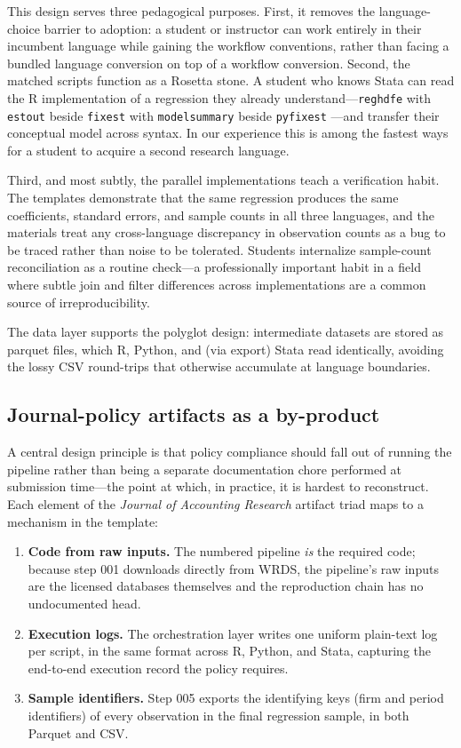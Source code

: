 \documentclass[12pt]{article}
\begin{document}
This design serves three pedagogical purposes. First, it removes the
language-choice barrier to adoption: a student or instructor can work
entirely in their incumbent language while gaining the workflow
conventions, rather than facing a bundled language conversion on top of a
workflow conversion. Second, the matched scripts function as a Rosetta
stone. A student who knows Stata can read the R implementation of a
regression they already understand---\texttt{reghdfe} with
\texttt{estout} \citep{reghdfe, estout} beside \texttt{fixest} with
\texttt{modelsummary} \citep{fixest, modelsummary} beside
\texttt{pyfixest} \citep{pyfixest}---and transfer their conceptual model
across syntax. In our experience this is among the fastest ways for a
student to acquire a second research language.

Third, and most subtly, the parallel implementations teach a verification
habit. The templates demonstrate that the same regression produces the
same coefficients, standard errors, and sample counts in all three
languages, and the materials treat any cross-language discrepancy in
observation counts as a bug to be traced rather than noise to be
tolerated. Students internalize sample-count reconciliation as a routine
check---a professionally important habit in a field where subtle join and
filter differences across implementations are a common source of
irreproducibility.

The data layer supports the polyglot design: intermediate datasets are
stored as parquet files, which R, Python, and (via export) Stata read
identically, avoiding the lossy CSV round-trips that otherwise accumulate
at language boundaries.

\subsection{Journal-policy artifacts as a by-product}

A central design principle is that policy compliance should fall out of
running the pipeline rather than being a separate documentation chore
performed at submission time---the point at which, in practice, it is
hardest to reconstruct. Each element of the \textit{Journal of Accounting
Research} artifact triad \citep{JARpolicy} maps to a mechanism in the
template:

\begin{enumerate}[leftmargin=*]
  \item \textbf{Code from raw inputs.} The numbered pipeline \emph{is}
  the required code; because step 001 downloads directly from WRDS, the
  pipeline's raw inputs are the licensed databases themselves and the
  reproduction chain has no undocumented head.
  \item \textbf{Execution logs.} The orchestration layer writes one
  uniform plain-text log per script, in the same format across R, Python,
  and Stata, capturing the end-to-end execution record the policy
  requires.
  \item \textbf{Sample identifiers.} Step 005 exports the identifying
  keys (firm and period identifiers) of every observation in the final
  regression sample, in both Parquet and CSV.
\end{enumerate}
\end{document}
